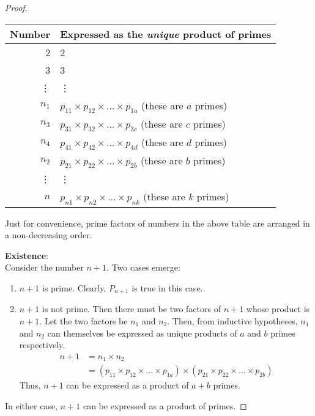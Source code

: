 \documentclass[a4paper]{article}
\begin{document}
\begin{proof}
        \begin{center}
            \begin{tabular}{|r|l|}
            \hline
                Number & Expressed as the \emph{unique} product of primes\\
            \hline
            2 & 2\\
            \hline
            3 & 3\\
            \hline
            \vdots & \vdots\\
            \hline
                \(n_1\) & $p_{11}\times p_{12}\times \dots \times p_{1a}$ (these are $a$ primes)\\
            \hline
                \(n_3\) & $p_{31}\times p_{32}\times \dots \times p_{3c}$ (these are $c$ primes)\\
            \hline
                \(n_4\) & $p_{41}\times p_{42}\times \dots \times p_{4d}$ (these are $d$ primes)\\
            \hline
                \(n_2\) & $p_{21}\times p_{22}\times \dots \times p_{2b}$ (these are $b$ primes)\\
            \hline
            \vdots & \vdots\\
            \hline
                \(n\) & $p_{n1}\times p_{n2}\times \dots \times p_{nk}$ (these are $k$ primes)\\
            \hline
            \end{tabular}
        \end{center}

        Just for convenience, prime factors of numbers 
        in the above table are arranged in a non-decreasing order.

 \noindent\textbf{Existence}:\\
    Consider the number $n+1$. Two cases emerge:
    \begin{enumerate}
        \item $n+1$ is prime. Clearly, $P_{n+1}$ is true in this case. 
        \item $n+1$ is not prime. Then there must be two factors of $n+1$ whose product is $n+1$. Let the two factors be $n_1$ and $n_2$. Then, from inductive hypotheses, $n_1$ and $n_2$ can themselves be expressed as unique products of $a$ and $b$ primes respectively.
            \begin{align*}
                n + 1 
                &= n_1 \times n_2\\
                &= (p_{11}\times p_{12}\times \dots \times p_{1a}) \times
                   (p_{21}\times p_{22}\times \dots \times p_{2b})
            \end{align*}
            Thus, $n+1$ can be expressed as a product of $a+b$ primes.
    \end{enumerate}
    In either case, $n+1$ can be expressed as a product of primes.


\end{proof}
\end{document}
